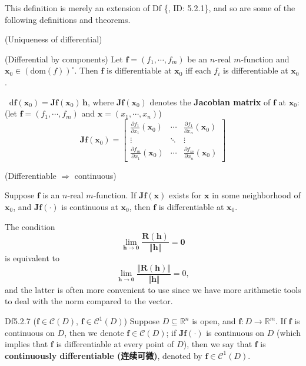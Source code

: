 \documentclass{article}
\newcommand{\parfrac}[2]{\frac{\partial #1}{\partial #2}}
\newcommand{\dif}{\mathop{}\!\mathrm{d}}
\begin{document}
\begin{Rmk}{}
    This definition is merely an extension of Df \{, ID: 5.2.1\}, and so are some of the following definitions and theorems.
    \begin{compactenum}
        \item \textcolor{Th}{(Uniqueness of differential)}
        \item \textcolor{Th}{(Differential by components) Let $\pmb{f} = (f_1, \cdots, f_m)$ be an $n$-real $m$-function and $\pmb{x}_0\in (\text{dom}(f))^\circ$. Then $\pmb{f}$ is differentiable at $\pmb{x}_0$ iff each $f_i$ is differentiable at $\pmb{x}_0$.}
        \item \textcolor{Th}{$\dif \pmb{f}(\pmb{x}_0) = \pmb{Jf}(\pmb{x}_0)\,\pmb{h}$,} \textcolor{Df}{where $\pmb{Jf}(\pmb{x}_0)$ denotes the \textbf{Jacobian matrix} of $\pmb{f}$ at $\pmb{x}_0$: (let $\pmb{f} = (f_1, \cdots, f_m)$ and $\pmb{x} = (x_1, \cdots, x_n)$)
        $$ \pmb{Jf}(\pmb{x}_0) = \begin{bmatrix}
            \parfrac{f_1}{x_1}(\pmb{x}_0) & \cdots & \parfrac{f_1}{x_n}(\pmb{x}_0)\\
            \vdots & \ddots & \vdots\\
            \parfrac{f_m}{x_1}(\pmb{x}_0) & \cdots & \parfrac{f_m}{x_n}(\pmb{x}_0)
        \end{bmatrix}
        $$}
        \item \textcolor{Th}{(Differentiable $\Rightarrow$ continuous)}
        \item \textcolor{Th}{Suppose $\pmb{f}$ is an $n$-real $m$-function. If $\pmb{Jf}(\pmb{x})$ exists for $\pmb{x}$ in some neighborhood of $\pmb{x}_0$, and $\pmb{Jf}(\cdot)$ is continuous at $\pmb{x}_0$, then $\pmb{f}$ is differentiable at $\pmb{x}_0$.}
        \item The condition 
        $$ \lim_{\pmb{h}\to \pmb{0}}\frac{\pmb{R}(\pmb{h})}{\Vert \pmb{h}\Vert} = \pmb{0} $$
        is equivalent to 
        $$ \lim_{\pmb{h}\to \pmb{0}}\frac{\Vert \pmb{R}(\pmb{h})\Vert}{\Vert \pmb{h}\Vert} = 0, $$
        and the latter is often more convenient to use since we have more arithmetic tools to deal with the norm compared to the vector.
    \end{compactenum}
\end{Rmk}

\begin{Df}{Df5.2.7 ($\pmb{f}\in\mathcal{C}(D)$, $\pmb{f}\in\mathcal{C}^1(D)$)}
    Suppose $D\subseteq\mathbb{R}^n$ is open, and $\pmb{f}: D\rightarrow\mathbb{R}^m$. If $\pmb{f}$ is continuous on $D$, then we denote $\pmb{f}\in\mathcal{C}(D)$; if $\pmb{Jf}(\cdot)$ is continuous on $D$ \textcolor{Th}{(which implies that $\pmb{f}$ is differentiable at every point of $D$)}, then we say that $\pmb{f}$ is \textbf{continuously differentiable (连续可微)}, denoted by $\pmb{f}\in\mathcal{C}^1(D)$.
\end{Df}
\end{document}
